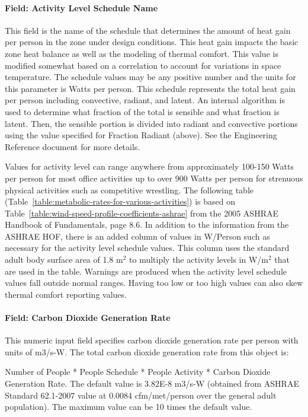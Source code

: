 \paragraph{Field: Activity Level Schedule Name}\label{field-activity-level-schedule-name}

This field is the name of the schedule that determines the amount of heat gain per person in the zone under design conditions. This heat gain impacts the basic zone heat balance as well as the modeling of thermal comfort. This value is modified somewhat based on a correlation to account for variations in space temperature. The schedule values may be any positive number and the units for this parameter is Watts per person. This schedule represents the total heat gain per person including convective, radiant, and latent. An internal algorithm is used to determine what fraction of the total is sensible and what fraction is latent. Then, the sensible portion is divided into radiant and convective portions using the value specified for Fraction Radiant (above). See the Engineering Reference document for more details.

Values for activity level can range anywhere from approximately 100-150 Watts per person for most office activities up to over 900 Watts per person for strenuous physical activities such as competitive wrestling. The following table (Table~\ref{table:metabolic-rates-for-various-activities}) is based on Table~\ref{table:wind-speed-profile-coefficients-ashrae} from the 2005 ASHRAE Handbook of Fundamentals, page 8.6. In addition to the information from the ASHRAE HOF, there is an added column of values in W/Person such as necessary for the activity level schedule values. This column uses the standard adult body surface area of 1.8 m\(^{2}\) to multiply the activity levels in W/m\(^{2}\) that are used in the table. Warnings are produced when the activity level schedule values fall outside normal ranges. Having too low or too high values can also skew thermal comfort reporting values.

\paragraph{Field: Carbon Dioxide Generation Rate}\label{field-carbon-dioxide-generation-rate}

This numeric input field specifies carbon dioxide generation rate per person with units of m3/s-W. The total carbon dioxide generation rate from this object is:

Number of People * People Schedule * People Activity * Carbon Dioxide Generation Rate. The default value is 3.82E-8 m3/s-W (obtained from ASHRAE Standard 62.1-2007 value at 0.0084 cfm/met/person over the general adult population). The maximum value can be 10 times the default value.

